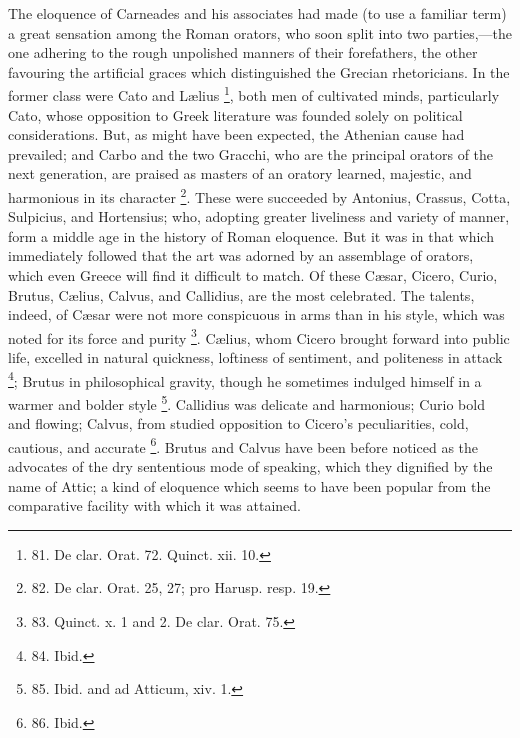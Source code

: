 The eloquence of Carneades and
his associates had made (to use a familiar term) a great sensation
among the Roman orators, who soon split into two parties,—the one
adhering to the rough unpolished manners of their forefathers, the
other favouring the artificial graces which distinguished the Grecian
rhetoricians. In the former class were Cato and Lælius \footnote{81. De clar. Orat. 72. Quinct.
xii. 10.},
both men of cultivated minds, particularly Cato, whose opposition to
Greek literature was founded solely on political considerations. But,
as might have been expected, the Athenian cause had prevailed; and
Carbo and the two Gracchi, who are the principal orators of the next
generation, are praised as masters of an oratory learned, majestic,
and harmonious in its character \footnote{82. De clar. Orat. 25, 27; pro
Harusp. resp. 19.}. These were succeeded
by Antonius, Crassus, Cotta, Sulpicius, and Hortensius; who, adopting
greater liveliness and variety of manner, form a middle age in the
history of Roman eloquence. But it was in that which immediately
followed that the art was adorned by an assemblage of orators, which
even Greece will find it difficult to match. Of these Cæsar, Cicero,
Curio, Brutus, Cælius, Calvus, and Callidius, are the most
celebrated. The talents, indeed, of Cæsar were not more conspicuous
in arms than in his style, which was noted for its force and purity \footnote{83. Quinct. x. 1 and 2. De
clar. Orat. 75.}. Cælius, whom Cicero brought forward into public life,
excelled in natural quickness, loftiness of sentiment, and politeness
in attack \footnote{84. Ibid.}; Brutus in philosophical gravity, though he
sometimes indulged himself in a warmer and bolder style \footnote{85. Ibid. and ad Atticum, xiv.
1.}.
Callidius was delicate and harmonious; Curio bold and flowing; Calvus,
from studied opposition to Cicero's peculiarities, cold, cautious,
and accurate \footnote{86. Ibid.}. Brutus and Calvus have been before noticed as
the advocates of the dry sententious mode of speaking, which they
dignified by the name of Attic; a kind of eloquence which seems to
have been popular from the comparative facility with which it was
attained.

